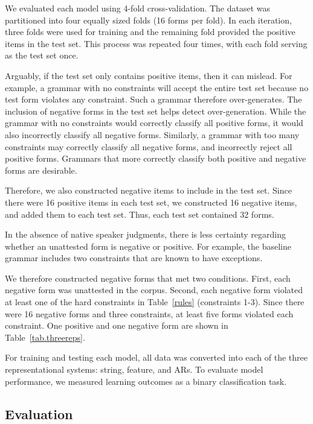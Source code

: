 \documentclass[11pt]{article}
\begin{document}
We evaluated each model using 4-fold cross-validation. 
The dataset was partitioned into four equally sized 
folds (16 forms per fold).
In each iteration, three folds were used for training
and the remaining fold provided the positive items in 
the test set. This process was repeated four times, with 
each fold serving as the test set once.

Arguably, if the test set only contains positive items, then it can mislead.
For example, a grammar with no constraints will accept the entire test set
because no test form violates any constraint.
Such a grammar therefore over-generates.
The inclusion of negative forms in the test set helps detect over-generation.
While the grammar with no constraints would correctly classify all positive
forms, it would also incorrectly classify all negative forms.
Similarly, a grammar with too many constraints may correctly classify all
negative forms,
and incorrectly reject all positive forms.
Grammars that more correctly classify both positive and negative forms are
desirable.

Therefore, we also constructed negative items to include in the test set.
Since there were 16 positive items in each test set,
we constructed 16 negative items, and added them to each test set.
Thus, each test set contained 32 forms.

In the absence of native speaker judgments,
there is less certainty regarding whether an unattested form is negative or
positive.
For example, the baseline grammar includes two constraints that are known to
have exceptions.

We therefore constructed negative forms that met two conditions.
First, each negative form was unattested in the corpus.
Second, each negative form violated at least one of the
hard constraints in Table~\ref{rules} (constraints 1-3).
Since there were 16 negative forms and three constraints,
at least five forms violated each constraint.
One positive and one negative form are shown in Table~\ref{tab.threereps}.


For training and testing each model, all data was converted into
each of the three representational systems: string, feature, and ARs.
To evaluate model performance, we measured learning outcomes
as a binary classification task.

\subsection{Evaluation}
\end{document}
